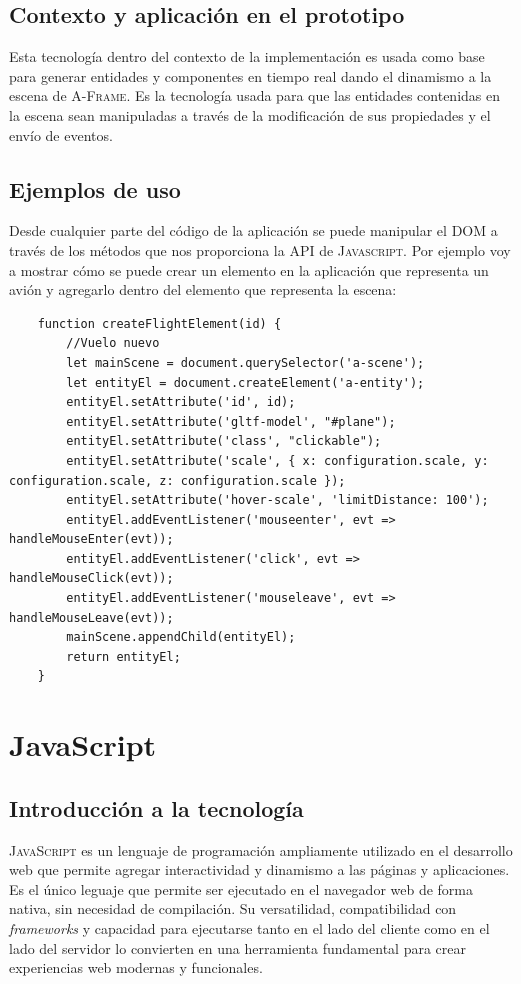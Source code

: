\documentclass[a4paper, 11pt]{book}
\begin{document}
\subsection{Contexto y aplicación en el prototipo}
Esta tecnología dentro del contexto de la implementación es usada como base para generar entidades y componentes en tiempo real dando el dinamismo a la escena de \textsc{A-Frame}. Es la tecnología usada para que las entidades contenidas en la escena sean manipuladas a través de la modificación de sus propiedades y el envío de eventos.
\subsection{Ejemplos de uso}
Desde cualquier parte del código de la aplicación se puede manipular el \textsc{DOM} a través de los métodos que nos proporciona la \textsc{\gls{API}} de \textsc{Javascript}. Por ejemplo voy a mostrar cómo se puede crear un elemento en la aplicación que representa un avión y agregarlo dentro del elemento que representa la escena:
\begin{verbatim}
	function createFlightElement(id) {
		//Vuelo nuevo
		let mainScene = document.querySelector('a-scene');
		let entityEl = document.createElement('a-entity');
		entityEl.setAttribute('id', id);
		entityEl.setAttribute('gltf-model', "#plane");
		entityEl.setAttribute('class', "clickable");
		entityEl.setAttribute('scale', { x: configuration.scale, y: configuration.scale, z: configuration.scale });
		entityEl.setAttribute('hover-scale', 'limitDistance: 100');
		entityEl.addEventListener('mouseenter', evt => handleMouseEnter(evt));
		entityEl.addEventListener('click', evt => handleMouseClick(evt));
		entityEl.addEventListener('mouseleave', evt => handleMouseLeave(evt));
		mainScene.appendChild(entityEl);
		return entityEl;
	}
\end{verbatim}
\section{JavaScript}
\label{sec:javascript}
\subsection{Introducción a la tecnología}
\textsc{JavaScript} es un lenguaje de programación ampliamente utilizado en el desarrollo web que permite agregar interactividad y dinamismo a las páginas y aplicaciones. Es el único leguaje que permite ser ejecutado en el navegador web de forma nativa, sin necesidad de compilación. Su versatilidad, compatibilidad con \emph{\gls{framework}s} y capacidad para ejecutarse tanto en el lado del cliente como en el lado del servidor lo convierten en una herramienta fundamental para crear experiencias web modernas y funcionales.
\end{document}
